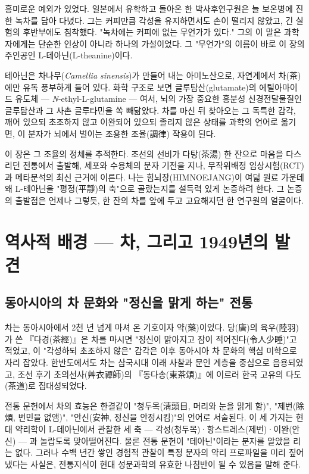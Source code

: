 \documentclass[12pt,oneside]{book}
\begin{document}
흥미로운 예외가 있었다. 일본에서 유학하고 돌아온 한 박사후연구원은 늘 보온병에 진한 녹차를 담아 다녔다. 그는 커피만큼 각성을 유지하면서도 손이 떨리지 않았고, 긴 실험의 후반부에도 침착했다. "녹차에는 커피에 없는 무언가가 있다." 그의 이 말은 과학자에게는 단순한 인상이 아니라 하나의 가설이었다. 그 "무언가"의 이름이 바로 이 장의 주인공인 L-테아닌(L-theanine)이다.

테아닌은 차나무(\textit{Camellia sinensis})가 만들어 내는 아미노산으로, 자연계에서 차(茶)에만 유독 풍부하게 들어 있다. 화학 구조로 보면 글루탐산(glutamate)의 에틸아마이드 유도체 — \textit{N}-ethyl-L-glutamine — 여서, 뇌의 가장 중요한 흥분성 신경전달물질인 글루탐산과 그 사촌 글루타민을 쏙 빼닮았다. 차를 마신 뒤 찾아오는 그 독특한 감각, 깨어 있으되 초조하지 않고 이완되어 있으되 졸리지 않은 상태를 과학의 언어로 옮기면, 이 분자가 뇌에서 벌이는 조용한 조율(調律) 작용이 된다.

이 장은 그 조율의 정체를 추적한다. 조선의 선비가 다탕(茶湯) 한 잔으로 마음을 다스리던 전통에서 출발해, 세포와 수용체의 분자 기전을 지나, 무작위배정 임상시험(RCT)과 메타분석의 최신 근거에 이른다. 나는 힘뇌장(HIMNOEJANG)이 여덟 원료 가운데 왜 L-테아닌을 "평정(平靜)의 축"으로 골랐는지를 설득력 있게 논증하려 한다. 그 논증의 출발점은 언제나 그렇듯, 한 잔의 차를 앞에 두고 고요해지던 한 연구원의 얼굴이다.

\section{역사적 배경 — 차, 그리고 1949년의 발견}

\subsection{동아시아의 차 문화와 "정신을 맑게 하는" 전통}

차는 동아시아에서 2천 년 넘게 마셔 온 기호이자 약(藥)이었다. 당(唐)의 육우(陸羽)가 쓴 『다경(茶經)』은 차를 마시면 "정신이 맑아지고 잠이 적어진다(令人少睡)"고 적었고, 이 "각성하되 초조하지 않은" 감각은 이후 동아시아 차 문화의 핵심 미학으로 자리 잡았다. 한반도에서도 차는 삼국시대 이래 사찰과 문인 계층을 중심으로 음용되었고, 조선 후기 초의선사(艸衣禪師)의 『동다송(東茶頌)』에 이르러 한국 고유의 다도(茶道)로 집대성되었다.

전통 문헌에서 차의 효능은 한결같이 "청두목(淸頭目, 머리와 눈을 맑게 함)", "제번(除煩, 번민을 없앰)", "안신(安神, 정신을 안정시킴)"의 언어로 서술된다. 이 세 가지는 현대 약리학이 L-테아닌에서 관찰한 세 축 — 각성(청두목)·항스트레스(제번)·이완(안신) — 과 놀랍도록 맞아떨어진다. 물론 전통 문헌이 "테아닌"이라는 분자를 알았을 리는 없다. 그러나 수백 년간 쌓인 경험적 관찰이 특정 분자의 약리 프로파일을 미리 짚어 냈다는 사실은, 전통지식이 현대 성분과학의 유효한 나침반이 될 수 있음을 말해 준다.
\end{document}

